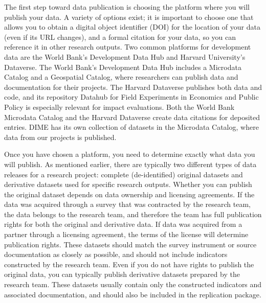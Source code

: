 The first step toward data publication is choosing the platform where you will publish your data.
A variety of options exist;
it is important to choose one that allows you to obtain a digital object identifier (DOI)
for the location of your data (even if its URL changes),
and a formal citation for your data, so you can reference it in other research outputs.
Two common platforms for development data are the World Bank's Development Data Hub
and Harvard University's Dataverse.
The World Bank's Development Data Hub
includes a Microdata Catalog
and a Geospatial Catalog,
where researchers can publish data and documentation for their projects.
The Harvard Dataverse publishes both data and code, 
and its repository
Datahub for Field Experiments in Economics and Public Policy
is especially relevant for impact evaluations.
Both the World Bank Microdata Catalog and the Harvard Dataverse
create data citations for deposited entries.
DIME has its own collection of datasets in the Microdata Catalog,
where data from our projects is published.

Once you have chosen a platform, you need to determine exactly what data you will publish.
As mentioned earlier, there are typically two different types of data releases for a research project:
complete (de-identified) original datasets and derivative datasets used for specific research outputs.
Whether you can publish the original dataset depends on data ownership and licensing agreements.
If the data was acquired through a survey that was contracted by the research team,
the data belongs to the research team,
and therefore the team has full publication rights for both the original and derivative data.
If data was acquired from a partner through a licensing agreement,
the terms of the license will determine publication rights.
These datasets should match the survey instrument or source documentation as closely as possible,
and should not include indicators constructed by the research team.
Even if you do not have rights to publish the original data,
you can typically publish derivative datasets prepared by the research team.
These datasets usually contain only the constructed indicators and associated documentation,
and should also be included in the replication package.

